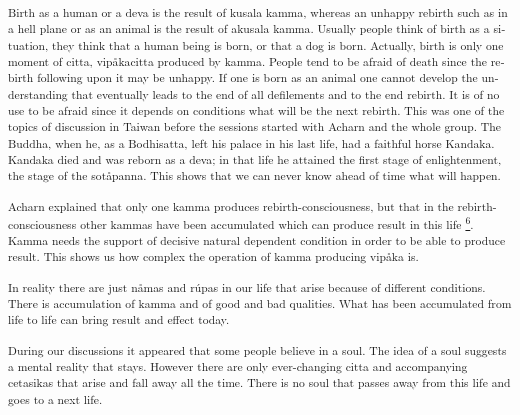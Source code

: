 \textsuperscript{\textdutch{Birth as a human or a deva is the result of
kusala kamma, whereas an unhappy rebirth such as in a hell plane or as
an animal is the result of akusala kamma. Usually people think of birth
as a situation, they think that a human being is born, or that a dog is
born. Actually, birth is only one moment of citta, vipåkacitta produced
by kamma. People tend to be afraid of death since the rebirth following
upon it may be unhappy. If one is born as an animal one cannot develop
the understanding that eventually leads to the end of all defilements
and to the end rebirth. It is of no use to be afraid since it depends on
conditions what will be the next rebirth. This was one of the topics of
discussion in Taiwan before the sessions started with Acharn and the
whole group. The Buddha, when he, as a Bodhisatta, left his palace in
his last life, had a faithful horse Kandaka. Kandaka died and was reborn
as a deva; in that life he attained the first stage of enlightenment,
the stage of the sotåpanna. This shows that we can never know ahead of
time what will happen. }}

\textsuperscript{\textportuguese{Acharn}\textdutch{ explained that
}\textenglish[variant=american]{only one kamma produces
rebirth-consciousness, but }\textdutch{that in the rebirth-consciousness
}\textenglish[variant=american]{other kammas}\textdutch{ have been
accumulated}\textenglish[variant=american]{ which can produce result in
this life}\textdutch{
\protect\hyperlink{sdfootnote6sym}{\textsuperscript{6}}}.
\textdutch{Kamma needs the support of decisive natural dependent
condition in order to be able to produce result. This shows us how
complex the operation of kamma producing vipåka is. }}

\textsuperscript{\textenglish[variant=american]{In reality there are
just n}\textdutch{å}\textenglish[variant=american]{mas and
r}\textdutch{ú}\textenglish[variant=american]{pas in our life that arise
because of different conditions. There is
accum}\textdutch{u}\textenglish[variant=american]{lation of kamma and of
good and bad qualities. What has been accumulated from life to life can
bring result and effect today. }}

\textsuperscript{\textenglish[variant=american]{During our discussions
it appeared that some people believe in a soul. The idea of a soul
suggests a mental reality that stays. However there are only
ever-changing citta and accompanying cetasikas that arise and fall away
all the time. There is no soul that passes away from this life and goes
to a next life.}}

